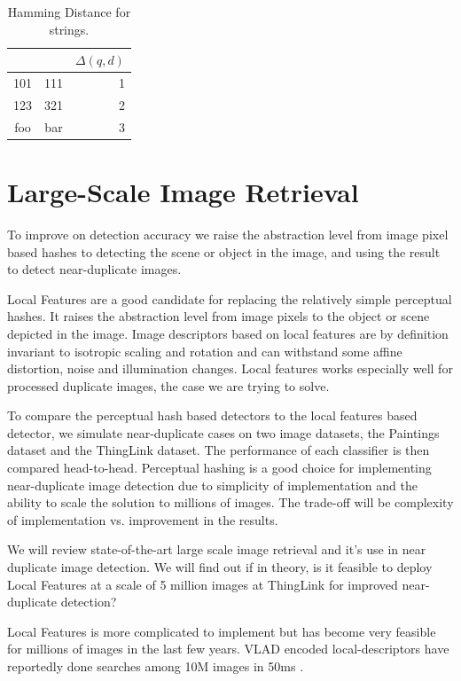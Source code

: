 \documentclass[english,12pt,a4paper,pdftex,elec,utf8, table]{aaltothesis}
\begin{document}
\begin{table}[htb]
\caption{Hamming Distance for strings.}
\label{hammingexamples}
\begin{center}
  \begin{tabular}{ccr}
&&$\Delta(q,d)$\\
    \hline \hline
    101 & 111 & 1\\
    \hline
    123 & 321 & 2\\
    \hline
    foo & bar & 3\\
    \hline
\end{tabular}
\end{center}\end{table}

\clearpage
\section{Large-Scale Image Retrieval}
To improve on detection accuracy we raise the abstraction level from image pixel based hashes to detecting the scene or object in the image, and using the result to detect near-duplicate images.

Local Features are a good candidate for replacing the relatively simple perceptual hashes. It raises the abstraction level from image pixels to the object or scene depicted in the image. Image descriptors based on local features are by definition invariant to isotropic scaling and rotation and can withstand some affine distortion, noise and illumination changes. Local features works especially well for processed duplicate images, the case we are trying to solve.

To compare the perceptual hash based detectors to the local features based detector, we simulate near-duplicate cases on two image datasets, the Paintings dataset and the ThingLink dataset. The performance of each classifier is then compared head-to-head. Perceptual hashing is a good choice for implementing near-duplicate image detection due to simplicity of implementation and the ability to scale the solution to millions of images. The trade-off will be complexity of implementation vs. improvement in the results.

We will review state-of-the-art large scale image retrieval and it's use in near duplicate image detection. We will find out if in theory, is it feasible to deploy Local Features at a scale of 5 million images at ThingLink for improved near-duplicate detection?

Local Features is more complicated to implement but has become very feasible for millions of images in the last few years. VLAD encoded local-descriptors have reportedly done searches among 10M images in 50ms \cite{Jegou2010}.
\end{document}
